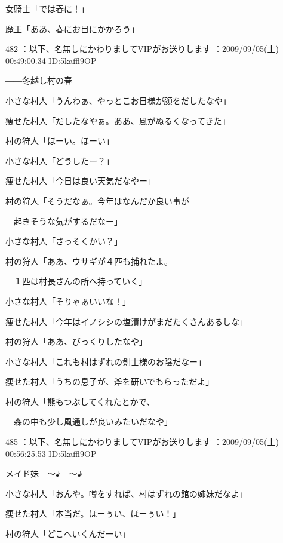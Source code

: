 \documentclass[a4j,twocolumn]{tarticle}
\begin{document}
女騎士「では春に！」\par{} 
魔王「ああ、春にお目にかかろう」 

	
    
    

482 ：以下、名無しにかわりましてVIPがお送りします ：2009/09/05(土) 00:49:00.34 ID:5kaffl9OP 


――冬越し村の春 



小さな村人「うんわぁ、やっとこお日様が顔をだしたなや」\par{} 
痩せた村人「だしたなやぁ。ああ、風がぬるくなってきた」 



村の狩人「ほーい。ほーい」 



小さな村人「どうしたー？」\par{} 
痩せた村人「今日は良い天気だなやー」 



村の狩人「そうだなぁ。今年はなんだか良い事が\par{} 
　起きそうな気がするだなー」 



小さな村人「さっそくかい？」 



村の狩人「ああ、ウサギが４匹も捕れたよ。\par{} 
　１匹は村長さんの所へ持っていく」 



小さな村人「そりゃぁいいな！」\par{} 
痩せた村人「今年はイノシシの塩漬けがまだたくさんあるしな」 



村の狩人「ああ、びっくりしたなや」 



小さな村人「これも村はずれの剣士様のお陰だなー」\par{} 
痩せた村人「うちの息子が、斧を研いでもらっただよ」\par{} 
村の狩人「熊もつぶしてくれたとかで、\par{} 
　森の中も少し風通しが良いみたいだなや」 

	
    
    

485 ：以下、名無しにかわりましてVIPがお送りします ：2009/09/05(土) 00:56:25.53 ID:5kaffl9OP 


メイド妹　～♪　～♪ 



小さな村人「おんや。噂をすれば、村はずれの館の姉妹だなよ」\par{} 
痩せた村人「本当だ。ほーぅい、ほーぅい！」\par{} 
村の狩人「どこへいくんだーい」 
\end{document}
